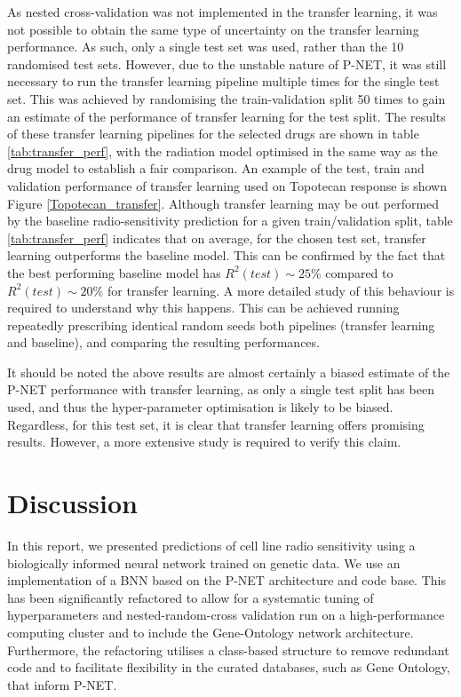 \documentclass[NOTE, disdraft=true, UKenglish]{\DISCDTLATEXPATH UCLCDTDISdoc}
\begin{document}
As nested cross-validation was not implemented in the transfer learning, it was not possible to obtain the same type of uncertainty on the transfer learning performance. As such, only a single test set was used, rather than the 10 randomised test sets. However, due to the unstable nature of P-NET, it was still necessary to run the transfer learning pipeline multiple times for the single test set. This was achieved by randomising the train-validation split 50 times to gain an estimate of the performance of transfer learning for the test split. The results of these transfer learning pipelines for the selected drugs are shown in table \ref{tab:transfer_perf}, with the radiation model optimised in the same way as the drug model to establish a fair comparison. An example of the test, train and validation performance of transfer learning used on Topotecan response is shown Figure \ref{Topotecan_transfer}. Although transfer learning may be out performed by the baseline radio-sensitivity prediction for a given train/validation split, table \ref{tab:transfer_perf} indicates that on average, for the chosen test set, transfer learning outperforms the baseline model. This can be confirmed by the fact that the best performing baseline model has $R^2(test) \sim 25\%$ compared to $R^2(test) \sim 20\%$ for transfer learning. A more detailed study of this behaviour is required to understand why this happens. This can be achieved running repeatedly prescribing identical random seeds both pipelines (transfer learning and baseline), and comparing the resulting performances.

It should be noted the above results are almost certainly a biased estimate of the P-NET performance with transfer learning, as only a single test split has been used, and thus the hyper-parameter optimisation is likely to be biased. Regardless, for this test set, it is clear that transfer learning offers promising results. However, a more extensive study is required to verify this claim.

%

\section{Discussion}
\label{sec:Discussion}

In this report, we presented predictions of cell line radio sensitivity using a biologically informed neural network trained on genetic data. We use an implementation of a BNN based on the P-NET architecture and code base. This has been significantly refactored to allow for a systematic tuning of hyperparameters and nested-random-cross validation run on a high-performance computing cluster and to include the Gene-Ontology network architecture. Furthermore, the refactoring utilises a class-based structure to remove redundant code and to facilitate flexibility in the curated databases, such as Gene Ontology, that inform P-NET.
\end{document}
